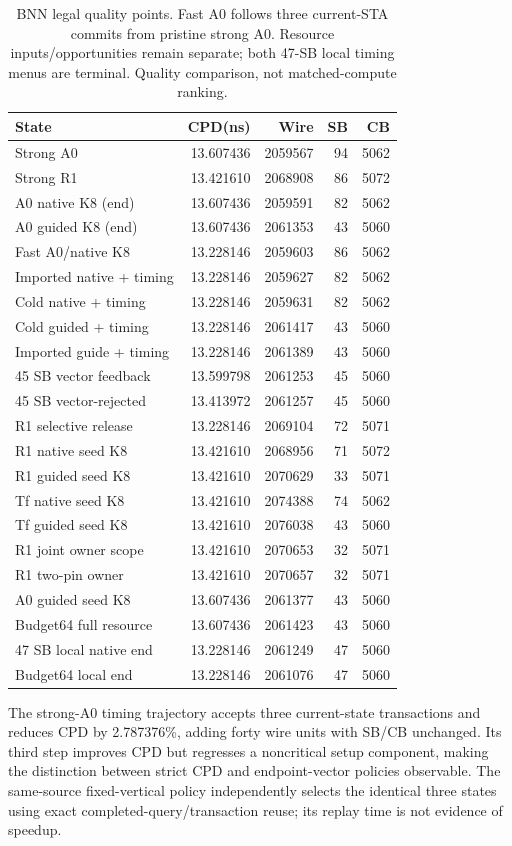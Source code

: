 \documentclass[conference,10pt]{IEEEtran}
\begin{document}
\begin{table}[t]
\centering\caption{BNN legal quality points. Fast A0 follows three current-STA commits from pristine strong A0. Resource inputs/opportunities remain separate; both 47-SB local timing menus are terminal. Quality comparison, not matched-compute ranking.}
\label{tab:bnn}
\small
\begin{tabular}{lrrrr}\hline
State & CPD(ns) & Wire & SB & CB\\\hline
Strong A0 &13.607436&2059567&94&5062\\
Strong R1 &13.421610&2068908&86&5072\\
A0 native K8 (end) &13.607436&2059591&82&5062\\
A0 guided K8 (end) &13.607436&2061353&43&5060\\
Fast A0/native K8 &13.228146&2059603&86&5062\\
Imported native + timing &13.228146&2059627&82&5062\\
Cold native + timing &13.228146&2059631&82&5062\\
Cold guided + timing &13.228146&2061417&43&5060\\
Imported guide + timing &13.228146&2061389&43&5060\\
45 SB vector feedback &13.599798&2061253&45&5060\\
45 SB vector-rejected &13.413972&2061257&45&5060\\
R1 selective release &13.228146&2069104&72&5071\\
R1 native seed K8 &13.421610&2068956&71&5072\\
R1 guided seed K8 &13.421610&2070629&33&5071\\
Tf native seed K8 &13.421610&2074388&74&5062\\
Tf guided seed K8 &13.421610&2076038&43&5060\\
R1 joint owner scope &13.421610&2070653&32&5071\\
R1 two-pin owner &13.421610&2070657&32&5071\\
A0 guided seed K8 &13.607436&2061377&43&5060\\
Budget64 full resource &13.607436&2061423&43&5060\\
47 SB local native end &13.228146&2061249&47&5060\\
Budget64 local end &13.228146&2061076&47&5060\\\hline
\end{tabular}
\end{table}
The strong-A0 timing trajectory accepts three current-state transactions and reduces CPD by 2.787376\%, adding forty wire units with SB/CB unchanged. Its third step improves CPD but regresses a noncritical setup component, making the distinction between strict CPD and endpoint-vector policies observable. The same-source fixed-vertical policy independently selects the identical three states using exact completed-query/transaction reuse; its replay time is not evidence of speedup.
\end{document}
